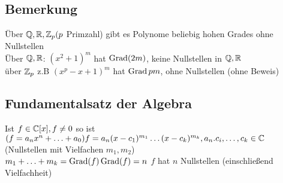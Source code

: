 \subsection{Bemerkung}
Über $\mathbb{Q},\mathbb{R},\mathbb{Z}_p (p$ Primzahl) gibt es Polynome beliebig hohen Grades ohne Nullstellen\\
Über $\mathbb{Q},\mathbb{R}$: $(x^2 +1)^m$ hat $\operatorname{Grad}(2m)$, keine Nullstellen in $\mathbb{Q},\mathbb{R}$\\
über $\mathbb{Z}_p$ z.B $(x^p - x +1)^m$ hat $\operatorname{Grad} pm$, ohne Nullstellen (ohne Beweis)
\subsection{Fundamentalsatz der Algebra}
Ist $ f \in \mathbb{C}[x], f \ne  0$ so ist $(f=a_nx^n+\ldots+a_0)\\
f = a_n (x-c_1)^{m_1} \ldots (x-c_k)^{m_k}, a_n.c_i,\ldots,c_k \in \mathbb{C}$ (Nullstellen mit Vielfachen $m_1,m_2$)\\
$m_1 + \ldots + m_k = \operatorname{Grad}(f)\\
\operatorname{Grad}(f) = n$ $f$ hat $n$ Nullstellen (einschlie\ss end Vielfachheit)
\printindex


